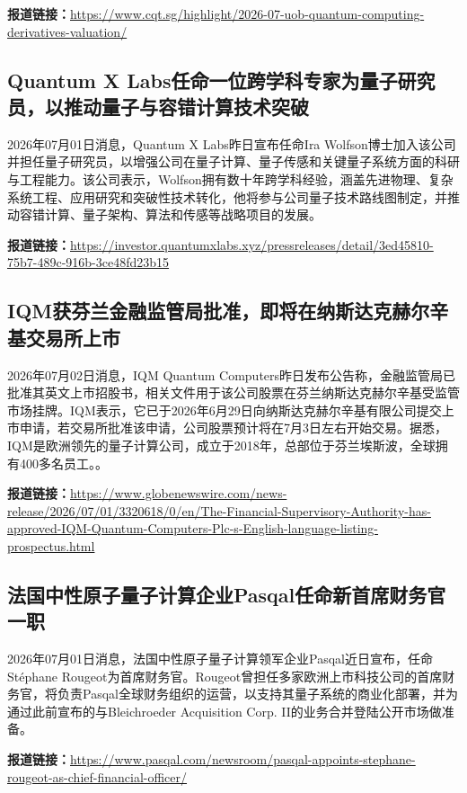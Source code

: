 \documentclass[12pt,a4paper]{ctexart}
\begin{document}
\noindent\textbf{报道链接：}\url{https://www.cqt.sg/highlight/2026-07-uob-quantum-computing-derivatives-valuation/}

\subsection{ Quantum X Labs任命一位跨学科专家为量子研究员，以推动量子与容错计算技术突破 }

2026年07月01日消息，Quantum X Labs昨日宣布任命Ira Wolfson博士加入该公司并担任量子研究员，以增强公司在量子计算、量子传感和关键量子系统方面的科研与工程能力。该公司表示，Wolfson拥有数十年跨学科经验，涵盖先进物理、复杂系统工程、应用研究和突破性技术转化，他将参与公司量子技术路线图制定，并推动容错计算、量子架构、算法和传感等战略项目的发展。

\noindent\textbf{报道链接：}\url{https://investor.quantumxlabs.xyz/pressreleases/detail/3ed45810-75b7-489c-916b-3ce48fd23b15}

\subsection{ IQM获芬兰金融监管局批准，即将在纳斯达克赫尔辛基交易所上市 }

2026年07月02日消息，IQM Quantum Computers昨日发布公告称，金融监管局已批准其英文上市招股书，相关文件用于该公司股票在芬兰纳斯达克赫尔辛基受监管市场挂牌。IQM表示，它已于2026年6月29日向纳斯达克赫尔辛基有限公司提交上市申请，若交易所批准该申请，公司股票预计将在7月3日左右开始交易。据悉，IQM是欧洲领先的量子计算公司，成立于2018年，总部位于芬兰埃斯波，全球拥有400多名员工。。

\noindent\textbf{报道链接：}\url{https://www.globenewswire.com/news-release/2026/07/01/3320618/0/en/The-Financial-Supervisory-Authority-has-approved-IQM-Quantum-Computers-Plc-s-English-language-listing-prospectus.html}

\subsection{ 法国中性原子量子计算企业Pasqal任命新首席财务官一职 }

2026年07月01日消息，法国中性原子量子计算领军企业Pasqal近日宣布，任命Stéphane Rougeot为首席财务官。Rougeot曾担任多家欧洲上市科技公司的首席财务官，将负责Pasqal全球财务组织的运营，以支持其量子系统的商业化部署，并为通过此前宣布的与Bleichroeder Acquisition Corp. II的业务合并登陆公开市场做准备。

\noindent\textbf{报道链接：}\url{https://www.pasqal.com/newsroom/pasqal-appoints-stephane-rougeot-as-chief-financial-officer/}
\end{document}
